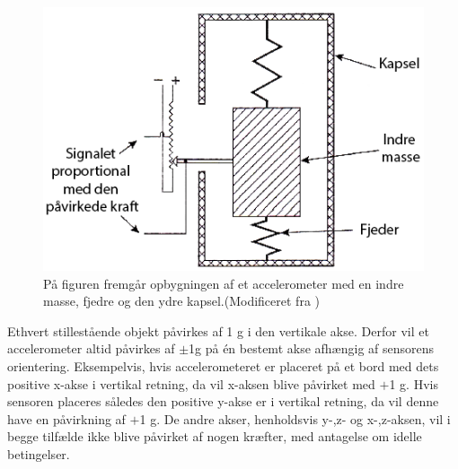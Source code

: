 \begin{figure}[H]
	\centering
	\includegraphics[scale=0.5]{figures/bProblemloesning/accelerometer_basic.png}
	\caption{På figuren fremgår opbygningen af et accelerometer med en indre masse, fjedre og den ydre kapsel.(Modificeret fra \citep{TittertonWeston2004})}
	\label{acc_simpelt}
\end{figure}

Ethvert stillestående objekt påvirkes af 1 g i den vertikale akse\citep{Serway2010}. Derfor vil et accelerometer altid påvirkes af $\pm$1g på én bestemt akse afhængig af sensorens orientering. Eksempelvis, hvis accelerometeret er placeret på et bord med dets positive x-akse i vertikal retning, da vil x-aksen blive påvirket med $+$1 g. Hvis sensoren placeres således den positive y-akse er i vertikal retning, da vil denne have en påvirkning af $+$1 g. De andre akser, henholdsvis y-,z- og x-,z-aksen, vil i begge tilfælde ikke blive påvirket af nogen kræfter, med antagelse om idelle betingelser. 

